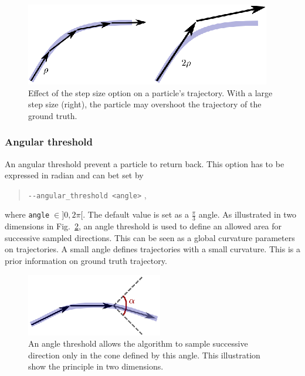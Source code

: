         \begin{figure}
            \centering
            \includegraphics[height=0.1\textheight]{stepSize}
            \caption{Effect of the step size option on a particle's trajectory. With a large step size (right), the particle may overshoot the trajectory of the ground truth.}
            \label{tracto-fig:stepSize}
        \end{figure}


    \subsubsection*{Angular threshold}
        An angular threshold prevent a particle to return back. This option has to be expressed in radian and can bet set by
            \begin{quote}
                \texttt{-\hspace{0.1mm}-angular\_threshold <angle>} \enspace ,
            \end{quote}
        where \texttt{angle}$\;\in]0,2\pi[$. The default value is set as a $\tfrac{\pi}{3}$ angle.
        As illustrated in two dimensions in Fig.~\ref{tracto-fig:angleThreshold}, an angle threshold is used to define an allowed area for successive sampled directions. This can be seen as a global curvature parameters on trajectories. A small angle defines trajectories with a small curvature. This is a prior information on ground truth trajectory.

        \begin{figure}
            \centering
            \includegraphics[height=0.1\textheight]{angleThreshold}
            \caption{An angle threshold allows the algorithm to sample successive direction only in the cone defined by this angle. This illustration show the principle in two dimensions.}
            \label{tracto-fig:angleThreshold}
        \end{figure}


